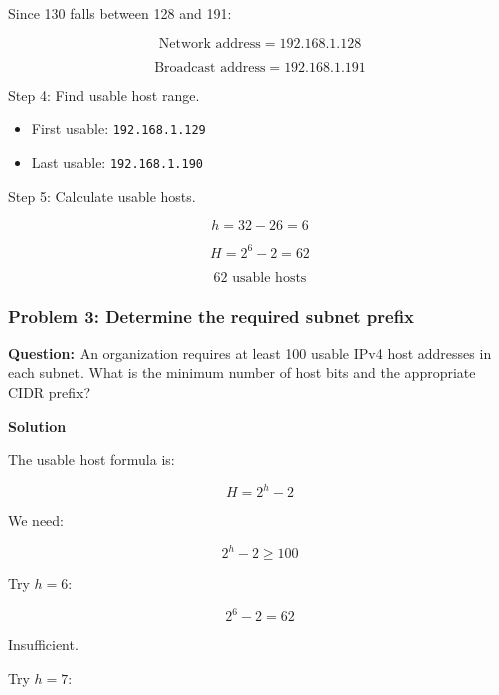 Since 130 falls between 128 and 191:



\[
\text{Network address}=192.168.1.128
\]





\[
\text{Broadcast address}=192.168.1.191
\]



Step 4: Find usable host range.

\begin{itemize}
\item First usable: \texttt{192.168.1.129}
\item Last usable: \texttt{192.168.1.190}
\end{itemize}

Step 5: Calculate usable hosts.



\[
h=32-26=6
\]





\[
H=2^6-2=62
\]





\[
\boxed{62\text{ usable hosts}}
\]



\subsubsection*{Problem 3: Determine the required subnet prefix}

\textbf{Question:} An organization requires at least 100 usable IPv4 host addresses in each subnet. What is the minimum number of host bits and the appropriate CIDR prefix?

\textbf{Solution}

The usable host formula is:



\[
H=2^h-2
\]



We need:



\[
2^h-2\geq100
\]



Try $h=6$:



\[
2^6-2=62
\]



Insufficient.

Try $h=7$:



